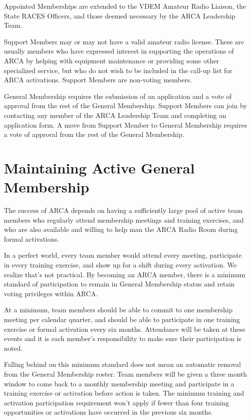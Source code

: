 \documentclass[pdflatex,letterpaper,twoside,12pt]{book}
\begin{document}
Appointed Memberships are extended to the VDEM Amateur Radio Liaison, the State RACES Officers, and those deemed necessary by the ARCA Leadership Team.

Support Members may or may not have a valid amateur radio license.  These are usually members who have expressed interest in supporting the operations of ARCA by helping with equipment maintenance or providing some other specialized service, but who do not wish to be included in the call-up list for ARCA activations.  Support Members are non-voting members.

General Membership requires the submission of an application and a vote of approval from the rest of the General Membership.  Support Members can join by contacting any member of the ARCA Leadership Team and completing an application form.  A move from Support Member to General Membership requires a vote of approval from the rest of the General Membership.

\section{Maintaining Active General Membership}

The success of ARCA depends on having a sufficiently large pool of active team members who regularly attend membership meetings and training exercises, and who are also available and willing to help man the ARCA Radio Room during formal activations.

In a perfect world, every team member would attend every meeting, participate in every training exercise, and show up for a shift during every activation.  We realize that's not practical.  By becoming an ARCA member, there is a minimum standard of participation to remain in General Membership status and retain voting privileges within ARCA.

At a minimum, team members should be able to commit to one membership meeting per calendar quarter, and should be able to participate in one training exercise or formal activation every six months.  Attendance will be taken at these events and it is each member's responsibility to make sure their participation is noted.


Falling behind on this minimum standard does not mean an automatic removal from the General Membership roster.  Team members will be given a three month window to come back to a monthly membership meeting and participate in a training exercise or activation before action is taken.  The minimum training and activation participation requirement won't apply if fewer than four training opportunities or activations have occurred in the previous six months.
\end{document}
